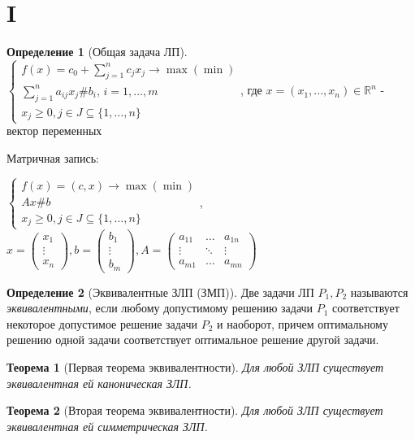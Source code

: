 \documentclass[a4paper]{article}
\newtheorem{theorem}{Теорема}[section]
\theoremstyle{definition}
\newtheorem*{definition}{Определение}
\theoremstyle{remark}
\begin{document}
\section{I}
\begin{definition}[Общая задача ЛП]
	$    \begin{cases}
			f(x) = c_0 + \sum_{j = 1}^n c_j x_j \to \max (\min)   \\
			\sum_{j = 1}^{n} a_{ij}x_j \# b_i, \, i = 1, \dots, m \\
			x_j \geq 0, j \in J\subseteq \{1, \dots, n\}
		\end{cases}$, где \(x = (x_1, ..., x_n)\in \mathbb{R}^n\) -  вектор переменных

	Матричная запись:

	$\begin{cases}
			f(x) = (c, x) \to \max(\min) \\
			Ax \# b                      \\
			x_j \geq 0, j \in J\subseteq \{1, \dots, n\}
		\end{cases}$, $x = \begin{pmatrix}
			x_1 \\ \vdots \\ x_n
		\end{pmatrix}, b = \begin{pmatrix}
			b_1 \\ \vdots \\ b_m
		\end{pmatrix},
		A = \begin{pmatrix}
			a_{11} & \dots  & a_{1n} \\
			\vdots & \ddots & \vdots \\
			a_{m1} & \dots  & a_{mn}
		\end{pmatrix}$
\end{definition}
\begin{definition}[Эквивалентные ЗЛП (ЗМП)]
	Две задачи ЛП $P_1, P_2$ называются \textit{эквивалентными}, если любому допустимому решению задачи $P_1$ соответствует некоторое допустимое решение задачи $P_2$ и наоборот, причем оптимальному решению одной задачи соответствует оптимальное решение другой задачи.
\end{definition}
\begin{theorem}[Первая теорема эквивалентности]
	Для любой ЗЛП существует эквивалентная ей каноническая ЗЛП.
\end{theorem}
\begin{theorem}[Вторая теорема эквивалентности]
	Для любой ЗЛП существует эквивалентная ей симметрическая ЗЛП.
\end{theorem}
\end{document}
